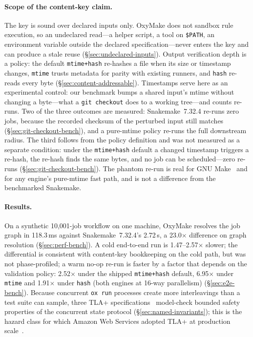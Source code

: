 \documentclass[12pt,a4paper]{article}
\newcommand{\code}[1]{{\texttt{\small\color{inlinecode}#1}}}
\begin{document}
\paragraph{Scope of the content-key claim.}
The key is sound over declared inputs only. OxyMake does not sandbox
rule execution, so an undeclared read---a helper script, a tool on
\code{\$PATH}, an environment variable outside the declared
specification---never enters the key and can produce a stale reuse
(\S\ref{sec:undeclared-inputs}). Output verification depth is a policy:
the default \code{mtime+hash} re-hashes a file when its size or
timestamp changes, \code{mtime} trusts metadata for parity with existing
runners, and \code{hash} re-reads every byte
(\S\ref{sec:content-addressable}). Timestamps serve here as an
experimental control: our benchmark bumps a shared input's
mtime without changing a byte---what a \code{git checkout} does to a
working tree---and counts re-runs. Two of the three outcomes are
measured: Snakemake~7.32.4 re-runs zero jobs, because the recorded
checksum of the perturbed input still matches
(\S\ref{sec:git-checkout-bench}), and a pure-mtime policy re-runs the
full downstream radius. The third follows from the policy definition
and was not measured as a separate condition: under the
\code{mtime+hash} default a
changed timestamp triggers a re-hash, the re-hash finds the same bytes,
and no job can be scheduled---zero re-runs
(\S\ref{sec:git-checkout-bench}). The phantom re-run is
real for GNU Make~\cite{feldmanMakeProgram1979} and for any engine's
pure-mtime fast path, and is not a difference from the benchmarked
Snakemake.

\paragraph{Results.}
On a synthetic 10,001-job workflow on one machine, OxyMake resolves the
job graph in 118.3\,ms against Snakemake~7.32.4's 2.72\,s, a 23.0$\times$
difference on graph resolution (\S\ref{sec:perf-bench}). A cold
end-to-end run is 1.47--2.57$\times$ slower; the differential is
consistent with content-key bookkeeping on the cold path, but was not
phase-profiled; a warm no-op re-run is faster
by a factor that depends on the validation policy: 2.52$\times$ under
the shipped \code{mtime+hash} default, 6.95$\times$ under \code{mtime}
and 1.91$\times$ under \code{hash} (both engines at 16-way
parallelism) (\S\ref{sec:e2e-bench}). Because concurrent \code{ox run} processes
create more interleavings than a test suite can sample, three TLA+
specifications~\cite{lamportSpecifyingSystems2002} model-check bounded
safety properties of the concurrent state protocol
(\S\ref{sec:named-invariants}); this is the hazard class for which
Amazon Web Services adopted TLA+ at production
scale~\cite[pp.~66--73]{newcombeHowAmazonWebServices2015}.
\end{document}
